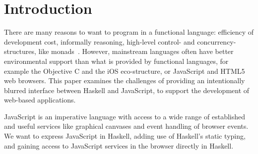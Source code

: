 \documentclass{llncs}
\begin{document}
\section{Introduction}\label{sec:intro}

There are many reasons to want to program in a functional language:
efficiency of development cost, informally reasoning, high-level 
control- and concurrency-structures, like monads~\cite{...}.
However, mainstream languages often have better environmental support
than what is provided by functional languages,
for example the Objective C and the iOS eco-structure, or JavaScript and HTML5
web browsers.
This paper examines the challenges of providing
an intentionally blurred interface between Haskell
and JavaScript, to support the development of web-based applications.

JavaScript is an imperative language with access to a wide range
of established and useful services like graphical canvases and event
handling of browser events. 
We want to express JavaScript in Haskell, adding use
of Haskell's static typing, and gaining access to JavaScript services
in the browser directly in Haskell.
\end{document}
